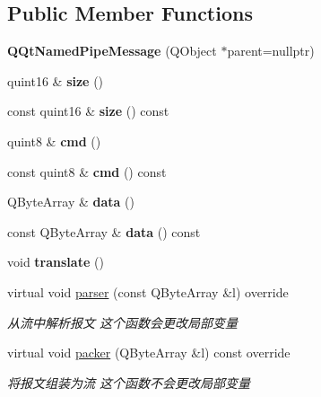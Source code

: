 \subsection*{Public Member Functions}
\begin{DoxyCompactItemize}
\item 
\mbox{\label{class_q_qt_named_pipe_message_aae6cb42705022030b27c16482beb7145}} 
{\bfseries Q\+Qt\+Named\+Pipe\+Message} (Q\+Object $\ast$parent=nullptr)
\item 
\mbox{\label{class_q_qt_named_pipe_message_a68490c329421e25ccda5935c50d7d308}} 
quint16 \& {\bfseries size} ()
\item 
\mbox{\label{class_q_qt_named_pipe_message_a98730206efdebe0bc07b1bdc505e60c4}} 
const quint16 \& {\bfseries size} () const
\item 
\mbox{\label{class_q_qt_named_pipe_message_abbf6f2ac165825d8b7a55ca42b05298c}} 
quint8 \& {\bfseries cmd} ()
\item 
\mbox{\label{class_q_qt_named_pipe_message_acb28ea4908bf9df1c0b1a5711f89ff05}} 
const quint8 \& {\bfseries cmd} () const
\item 
\mbox{\label{class_q_qt_named_pipe_message_a61a17788487e09608408eda69bb6dd62}} 
Q\+Byte\+Array \& {\bfseries data} ()
\item 
\mbox{\label{class_q_qt_named_pipe_message_ad25b167034f6f28399ecfc32d600fde0}} 
const Q\+Byte\+Array \& {\bfseries data} () const
\item 
\mbox{\label{class_q_qt_named_pipe_message_a4e724e2e32ca6a2ff24c29baa42c88cb}} 
void {\bfseries translate} ()
\item 
virtual void \mbox{\hyperlink{class_q_qt_named_pipe_message_aaf7e90af917029afb616efc4d8141073}{parser}} (const Q\+Byte\+Array \&l) override
\begin{DoxyCompactList}\small\item\em 从流中解析报文 这个函数会更改局部变量 \end{DoxyCompactList}\item 
virtual void \mbox{\hyperlink{class_q_qt_named_pipe_message_a3977c2f52260318380edc09d2d1f7df0}{packer}} (Q\+Byte\+Array \&l) const override
\begin{DoxyCompactList}\small\item\em 将报文组装为流 这个函数不会更改局部变量 \end{DoxyCompactList}\end{DoxyCompactItemize}


